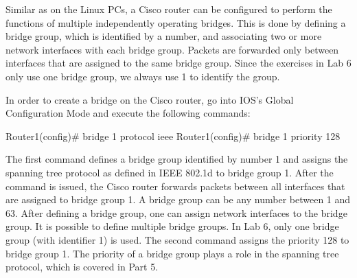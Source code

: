 Similar as on the Linux PCs, a Cisco router can be configured to perform the functions of multiple independently operating bridges. This is done by defining a bridge group, which is identified by a number, and associating two or more network interfaces with each bridge group. Packets are forwarded only between interfaces that are assigned to the same bridge group. Since the exercises in Lab 6 only use one bridge group, we always use 1 to identify the group.

In order to create a bridge on the Cisco router, go into IOS's Global Configuration Mode and execute the following commands:
\begin{cmdblock}
	Router1(config)# bridge 1 protocol ieee
	Router1(config)# bridge 1 priority 128
\end{cmdblock}

The first command defines a bridge group identified by number 1 and assigns the spanning tree protocol as defined in IEEE 802.1d to bridge group 1. After the command is issued, the Cisco router forwards packets between all interfaces that are assigned to bridge group 1. A bridge group can be any number between 1 and 63. After defining a bridge group, one can assign network interfaces to the bridge group. It is possible to define multiple bridge groups. In Lab 6, only one bridge group (with identifier 1) is used.
The second command assigns the priority 128 to bridge group 1. The priority of a bridge group plays a role in the spanning tree protocol, which is covered in Part 5.



